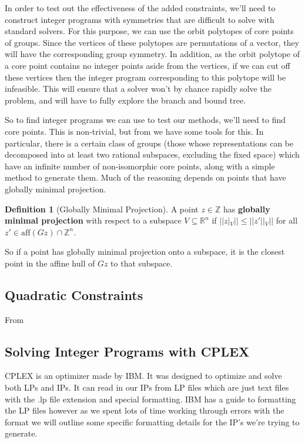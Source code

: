 \documentclass[11pt]{article} %
\theoremstyle{definition}
\newtheorem{definition}[theorem]{Definition}
\theoremstyle{remark}
\newcommand{\ZZ}{\mathbb{Z}}
\begin{document}
In order to test out the effectiveness of the added constraints, we'll need to construct integer programs with symmetries that are difficult to solve with standard solvers. For this purpose, we can use the orbit polytopes of core points of groups. Since the vertices of these polytopes are permutations of a vector, they will have the corresponding group symmetry. In addition, as the orbit polytope of a core point contains no integer points aside from the vertices, if we can cut off these vertices then the integer program corresponding to this polytope will be infeasible. This will ensure that a solver won't by chance rapidly solve the problem, and will have to fully explore the branch and bound tree.

So to find integer programs we can use to test our methods, we'll need to find core points. This is non-trivial, but from \cite{rehn} we have some tools for this. In particular, there is a certain class of groups (those whose representations can be decomposed into at least two rational subspaces, excluding the fixed space) which have an infinite number of non-isomorphic core points, along with a simple method to generate them. Much of the reasoning depends on points that have globally minimal projection.

\begin{definition}[Globally Minimal Projection]
A point $z \in \ZZ$ has \textbf{globally minimal projection} with respect to a subspace $V \subseteq \mathbb{R}^n$ if $||z|_V|| \leq ||z'||_V||$ for all $z' \in \textrm{aff}(Gz) \cap \mathbb{Z}^n$.
\end{definition}

So if a point has globally minimal projection onto a subspace, it is the closest point in the affine hull of $Gz$ to that subspace.


\subsection{Quadratic Constraints}

From 

\subsection{Solving Integer Programs with CPLEX}

CPLEX is an optimizer made by IBM. It was designed to optimize and solve both LPs and IPs. It can read in our IPs from LP files which are just text files with the .lp file extension and special formatting. IBM has a guide to formatting the LP files however as we spent lots of time working through errors with the format we will outline some specific formatting details for the IP's we're trying to generate. 
\end{document}
